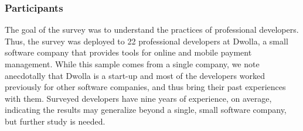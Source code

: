 \subsubsection{Participants}
The goal of the survey was to understand the practices of professional developers. Thus, the survey was deployed to 22 professional developers at Dwolla, a small software company that provides tools for online and mobile payment management. While this sample comes from a single company, we note anecdotally that Dwolla is a start-up and most of the developers worked previously for other software companies, and thus bring their past experiences with them. Surveyed developers have nine years of experience, on average, indicating the results may generalize beyond a single, small software company, but further study is needed.
